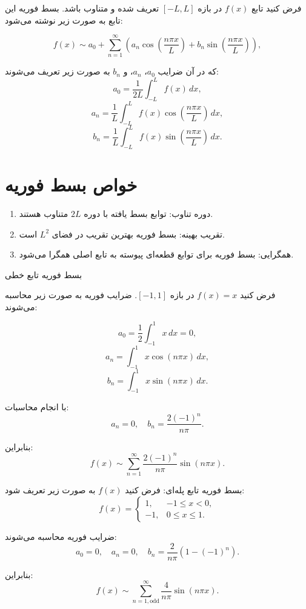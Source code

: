 فرض کنید تابع \(f(x)\) در بازه \([-L, L]\) تعریف شده و متناوب باشد. بسط فوریه این تابع به صورت زیر نوشته می‌شود:

\[
f(x) \sim a_0 + \sum_{n=1}^\infty \left( a_n \cos\left(\frac{n \pi x}{L}\right) + b_n \sin\left(\frac{n \pi x}{L}\right) \right),
\]

که در آن ضرایب \(a_0\)، \(a_n\)، و \(b_n\) به صورت زیر تعریف می‌شوند:
\[
a_0 = \frac{1}{2L} \int_{-L}^L f(x) \, dx,
\]
\[
a_n = \frac{1}{L} \int_{-L}^L f(x) \cos\left(\frac{n \pi x}{L}\right) \, dx,
\]
\[
b_n = \frac{1}{L} \int_{-L}^L f(x) \sin\left(\frac{n \pi x}{L}\right) \, dx.
\]

\section{خواص بسط فوریه}
\begin{enumerate}
	\item 
	دوره تناوب: توابع بسط یافته با دوره \(2L\) متناوب هستند.
	\item 
	تقریب بهینه: بسط فوریه بهترین تقریب در فضای \(L^2\) است.
	\item 
	همگرایی: بسط فوریه برای توابع قطعه‌ای پیوسته به تابع اصلی همگرا می‌شود.
\end{enumerate}


\begin{example}
	بسط فوریه تابع خطی
	
\end{example}
\begin{solution}
	
	فرض کنید \(f(x) = x\) در بازه \([-1, 1]\). ضرایب فوریه به صورت زیر محاسبه می‌شوند:
	
	\[
	a_0 = \frac{1}{2} \int_{-1}^1 x \, dx = 0,
	\]
	\[
	a_n = \int_{-1}^1 x \cos(n \pi x) \, dx,
	\]
	\[
	b_n = \int_{-1}^1 x \sin(n \pi x) \, dx.
	\]
	
	با انجام محاسبات:
	\[
	a_n = 0, \quad b_n = \frac{2(-1)^n}{n \pi}.
	\]
	
	بنابراین:
	\[
	f(x) \sim \sum_{n=1}^\infty \frac{2(-1)^n}{n \pi} \sin(n \pi x).
	\]
\end{solution}
\begin{example}
	بسط فوریه تابع پله‌ای: 	فرض کنید \(f(x)\) به صورت زیر تعریف شود:
	\[
	f(x) = 
	\begin{cases} 
		1, & -1 \leq x < 0, \\
		-1, & 0 \leq x \leq 1.
	\end{cases}
	\]
\end{example}

\begin{solution}
	ضرایب فوریه محاسبه می‌شوند:
	\[
	a_0 = 0, \quad a_n = 0, \quad b_n = \frac{2}{n \pi} \left(1 - (-1)^n\right).
	\]
	
	بنابراین:
	\[
	f(x) \sim \sum_{n=1, \text{odd}}^\infty \frac{4}{n \pi} \sin(n \pi x).
	\]
\end{solution}
